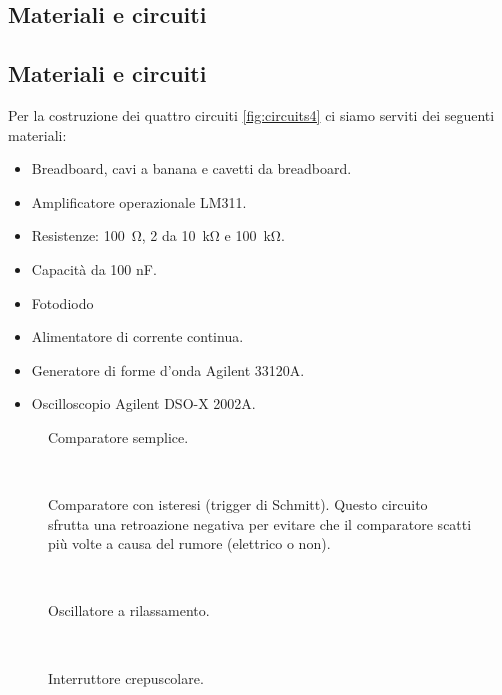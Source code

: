 \subsection{Materiali e circuiti}

\subsection{Materiali e circuiti}

Per la costruzione dei quattro circuiti \ref{fig:circuits4} ci
siamo serviti dei seguenti materiali:

\begin{itemize}
    \item{Breadboard, cavi a banana e cavetti da breadboard.}
    \item{Amplificatore operazionale LM311.}
    \item{Resistenze: \SI{100}{\ohm}, 2 da \SI{10}{\kilo\ohm} e \SI{100}{\kilo\ohm}.}
    \item{Capacità da 100 nF.}
    \item{Fotodiodo}
    \item{Alimentatore di corrente continua.}
    \item{Generatore di forme d'onda Agilent 33120A.}
    \item{Oscilloscopio Agilent DSO-X 2002A.}
\end{itemize}

\begin{figure*}[b!]
        \centering
        \small
        \begin{subfigure}[b]{0.48\textwidth}
            \def\svgwidth{\columnwidth}
            \caption{Comparatore semplice.}
            \label{fig:comparatore4}
        \end{subfigure}
        ~
        \begin{subfigure}[b]{0.48\textwidth}
            \def\svgwidth{\columnwidth}
            \caption{Comparatore con isteresi (trigger di Schmitt). Questo circuito
                sfrutta una retroazione negativa per evitare che il comparatore
                scatti più volte a causa del rumore (elettrico o non).}
            \label{fig:trigger_schmitt4}
        \end{subfigure}
        ~
        \begin{subfigure}[b]{0.48\textwidth}
            \def\svgwidth{\columnwidth}
            \caption{Oscillatore a rilassamento.}
            \label{fig:oscillatore4}
        \end{subfigure}
        ~
        \begin{subfigure}[b]{0.48\textwidth}
            \centering
            \def\svgwidth{0.8\columnwidth}
            \caption{Interruttore crepuscolare.}
            \label{fig:crepuscolare4}
        \end{subfigure}

        \caption{Circuiti costruiti durante l'esperienza}
        \label{fig:circuits4}
\end{figure*}
